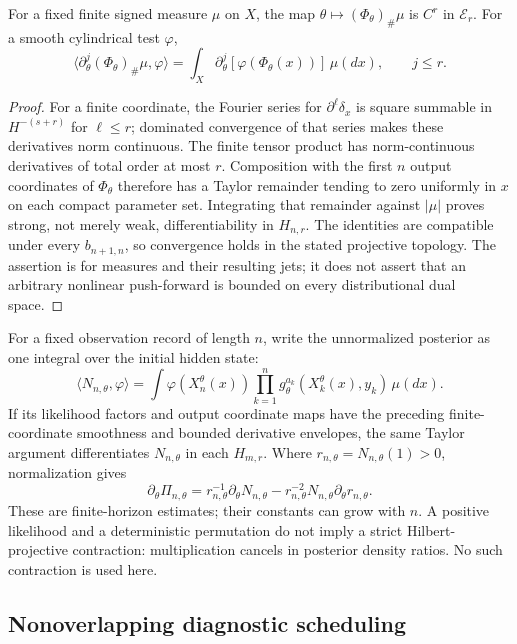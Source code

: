 \begin{theorem}
\label{thm:r33-c1-push}
For a fixed finite signed measure $\mu$ on $X$, the map
$\theta\mapsto(\Phi_\theta)_\#\mu$ is $C^r$ in $\mathscr E_r$.
For a smooth cylindrical test $\varphi$,
\[
 \langle\partial_\theta^j(\Phi_\theta)_\#\mu,\varphi\rangle
 =\int_X\partial_\theta^j[\varphi(\Phi_\theta(x))]\,\mu(dx),
 \qquad j\le r.
\]
\end{theorem}
\begin{proof}
For a finite coordinate, the Fourier series for $\partial^\ell\delta_x$ is
square summable in $H^{-(s+r)}$ for $\ell\le r$; dominated convergence of
that series makes these derivatives norm continuous.  The finite tensor
product has norm-continuous derivatives of total order at most $r$.
Composition with the first $n$ output coordinates of $\Phi_\theta$ therefore
has a Taylor remainder tending to zero uniformly in $x$ on each compact
parameter set.  Integrating that remainder against $|\mu|$ proves strong,
not merely weak, differentiability in $H_{n,r}$.  The identities are compatible
under every $b_{n+1,n}$, so convergence holds in the stated projective topology.
The assertion is for measures and their resulting jets; it does not assert
that an arbitrary nonlinear push-forward is bounded on every distributional
dual space.
\end{proof}

For a fixed observation record of length $n$, write the unnormalized posterior
as one integral over the initial hidden state:
\[
 \langle N_{n,\theta},\varphi\rangle
 =\int\varphi(X_n^\theta(x))
   \prod_{k=1}^n g_\theta^{a_k}(X_k^\theta(x),y_k)\,\mu(dx).
\]
If its likelihood factors and output coordinate maps have the preceding
finite-coordinate smoothness and bounded derivative envelopes, the same
Taylor argument differentiates $N_{n,\theta}$ in each $H_{m,r}$.
Where $r_{n,\theta}=N_{n,\theta}(1)>0$, normalization gives
\[
 \partial_\theta\Pi_{n,\theta}
 =r_{n,\theta}^{-1}\partial_\theta N_{n,\theta}
  -r_{n,\theta}^{-2}N_{n,\theta}\partial_\theta r_{n,\theta}.
\]
These are finite-horizon estimates; their constants can grow with $n$.
A positive likelihood and a deterministic permutation do not imply a strict
Hilbert-projective contraction: multiplication cancels in posterior density
ratios.  No such contraction is used here.

\subsection{Nonoverlapping diagnostic scheduling}

